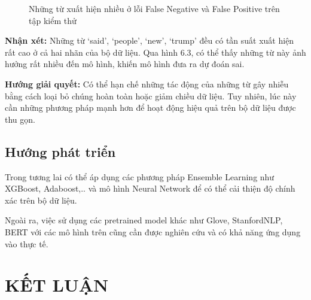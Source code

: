 \documentclass[12pt,a4paper,oneside]{book}
\begin{document}
\begin{figure}[H]
	\hfill
	\caption{Những từ xuất hiện nhiều ở lỗi False Negative và False Positive trên tập kiểm thử} 
\end{figure}

\textbf{Nhận xét:} Những từ `said', `people', `new', `trump' đều có tần suất xuất hiện rất cao ở cả hai nhãn của bộ dữ liệu. Qua hình 6.3, có thể thấy những từ này ảnh hưởng rất nhiều đến mô hình, khiến mô hình đưa ra dự đoán sai.

\textbf{Hướng giải quyết:} Có thể hạn chế những tác động của những từ gây nhiễu bằng cách loại bỏ chúng hoàn toàn hoặc giảm chiều dữ liệu. Tuy nhiên, lúc này cần những phương pháp mạnh hơn để hoạt động hiệu quả trên bộ dữ liệu được thu gọn.

\section{Hướng phát triển}
Trong tương lai có thể áp dụng các phương pháp Ensemble Learning như XGBoost, Adaboost,.. và mô hình Neural Network để có thể cải thiện độ chính xác trên bộ dữ liệu.

Ngoài ra, việc sử dụng các pretrained model khác như Glove, StanfordNLP, BERT với các mô hình trên cũng cần được nghiên cứu và có khả năng ứng dụng vào thực tế.

\chapter*{KẾT LUẬN}
\end{document}
